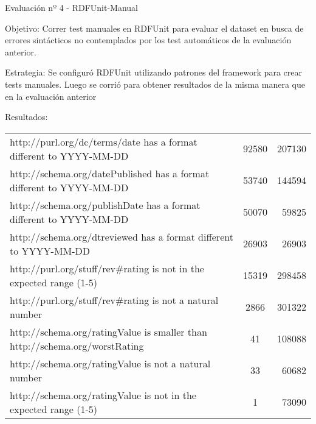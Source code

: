 Evaluación nº 4 - RDFUnit-Manual

Objetivo: Correr test manuales en RDFUnit para evaluar el dataset en busca de errores sintácticos no contemplados por los test
automáticos de la evaluación anterior.

Estrategia: Se configuró RDFUnit utilizando patrones del framework para crear tests manuales. Luego se corrió para obtener resultados
de la misma manera que en la evaluación anterior

Resultados:
\begin{tabular}{| l | c | r | }
http://purl.org/dc/terms/date has a format different to YYYY-MM-DD & 92580 & 207130\\
http://schema.org/datePublished has a format different to YYYY-MM-DD & 53740 & 144594\\
http://schema.org/publishDate has a format different to YYYY-MM-DD & 50070 & 59825\\
http://schema.org/dtreviewed has a format different to YYYY-MM-DD & 26903 & 26903\\ 
http://purl.org/stuff/rev\#rating is not in the expected range (1-5) & 15319 & 298458\\
http://purl.org/stuff/rev\#rating is not a natural number & 2866 & 301322\\
http://schema.org/ratingValue is smaller than http://schema.org/worstRating & 41 & 108088 \\
http://schema.org/ratingValue is not a natural number & 33 & 60682\\
http://schema.org/ratingValue is not in the expected range (1-5) & 1 & 73090 
\end{tabular}






